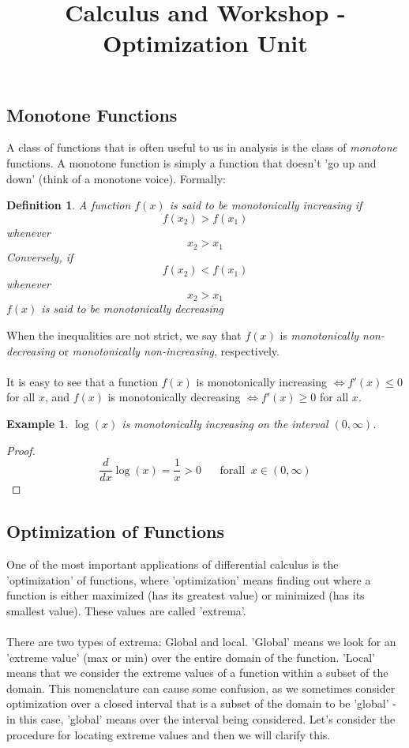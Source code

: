 \documentclass[12pt,a4paper]{article} %
\title{Calculus and Workshop - Optimization Unit}
\newtheorem{defn}{Definition}
\newtheorem{example}{Example}
\begin{document}
\maketitle
\subsection{Monotone Functions}
A class of functions that is often useful to us in analysis is the class of \emph{monotone} functions.  A monotone function is simply a function that doesn't 'go up and down' (think of a monotone voice).  Formally:
\begin{defn}
A function $f(x)$ is said to be \emph{monotonically increasing} if
$$f(x_2) > f(x_1)$$
whenever
$$x_2 > x_1$$ 
Conversely, if 
$$f(x_2) < f(x_1)$$
whenever
$$x_2 > x_1$$
$f(x)$ is said to be \emph{monotonically decreasing} 
\end{defn}
When the inequalities are not strict, we say that $f(x)$ is \emph{monotonically non-decreasing} or \emph{monotonically non-increasing}, respectively. \\\\
 It is easy to see that a function $f(x)$ is monotonically increasing $\iff f'(x)\leq0$ for all $x$, and $f(x)$ is monotonically decreasing $\iff f'(x)\geq0$ for all $x$.   
\begin{example}
$\log(x)$ is monotonically increasing on the interval $(0,\infty)$. 
\end{example}
\begin{proof}
$$\frac{d}{dx}\log(x) = \frac{1}{x} > 0 \;\;\;\;\;\;\mathrm{for all }\;\; x\in(0,\infty)$$
\end{proof}
\subsection{Optimization of Functions}
One of the most important applications of differential calculus is the 'optimization' of functions, where 'optimization' means finding out where a function is either maximized (has its greatest value) or minimized (has its smallest value).  These values are called 'extrema'.  \\\\
There are two types of extrema: Global and local.  'Global' means we look for an 'extreme value' (max or min) over the entire domain of the function.  'Local' means that we consider the extreme values of a function within a subset of the domain.  This nomenclature can cause some confusion, as we sometimes consider optimization over a closed interval that is a subset of the domain to be 'global' - in this case, 'global' means over the interval being considered.  Let's consider the procedure for locating extreme values and then we will clarify this.\\\\
\end{document}
